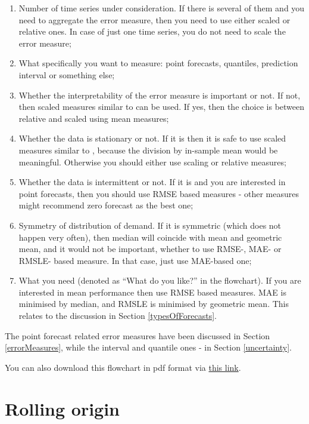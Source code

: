 \documentclass[
]{book}
\providecommand{\tightlist}{%
  \setlength{\itemsep}{0pt}\setlength{\parskip}{0pt}}
\theoremstyle{definition}
\theoremstyle{definition}
\theoremstyle{definition}
\theoremstyle{definition}
\theoremstyle{remark}
\begin{document}
\begin{enumerate}
\def\labelenumi{\arabic{enumi}.}
\tightlist
\item
  Number of time series under consideration. If there is several of them and you need to aggregate the error measure, then you need to use either scaled or relative ones. In case of just one time series, you do not need to scale the error measure;
\item
  What specifically you want to measure: point forecasts, quantiles, prediction interval or something else;
\item
  Whether the interpretability of the error measure is important or not. If not, then scaled measures similar to \citet{Hyndman2006} can be used. If yes, then the choice is between relative and scaled using mean measures;
\item
  Whether the data is stationary or not. If it is then it is safe to use scaled measures similar to \citet{Petropoulos2015}, because the division by in-sample mean would be meaningful. Otherwise you should either use \citet{Hyndman2006} scaling or relative measures;
\item
  Whether the data is intermittent or not. If it is and you are interested in point forecasts, then you should use RMSE based measures - other measures might recommend zero forecast as the best one;
\item
  Symmetry of distribution of demand. If it is symmetric (which does not happen very often), then median will coincide with mean and geometric mean, and it would not be important, whether to use RMSE-, MAE- or RMSLE- based measure. In that case, just use MAE-based one;
\item
  What you need (denoted as ``What do you like?'' in the flowchart). If you are interested in mean performance then use RMSE based measures. MAE is minimised by median, and RMSLE is minimised by geometric mean. This relates to the discussion in Section \ref{typesOfForecasts}.
\end{enumerate}

The point forecast related error measures have been discussed in Section \ref{errorMeasures}, while the interval and quantile ones - in Section \ref{uncertainty}.

You can also download this flowchart in pdf format via \href{./images/errorMeasuresFlowChart-v2.pdf}{this link}.

\hypertarget{rollingOrigin}{%
\section{Rolling origin}\label{rollingOrigin}}
\end{document}
